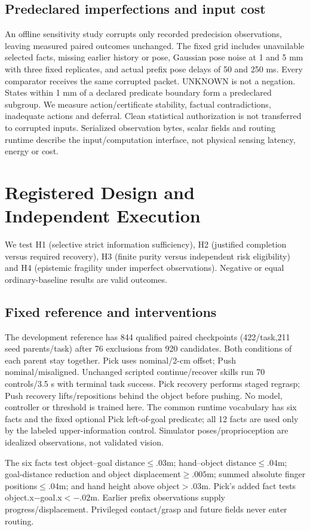 \documentclass[conference]{IEEEtran}
\begin{document}
\subsection{Predeclared imperfections and input cost}
An offline sensitivity study corrupts only recorded predecision observations, leaving measured paired outcomes unchanged. The fixed grid includes unavailable selected facts, missing earlier history or pose, Gaussian pose noise at 1 and 5 mm with three fixed replicates, and actual prefix pose delays of 50 and 250 ms. Every comparator receives the same corrupted packet. UNKNOWN is not a negation. States within 1 mm of a declared predicate boundary form a predeclared subgroup. We measure action/certificate stability, factual contradictions, inadequate actions and deferral. Clean statistical authorization is not transferred to corrupted inputs. Serialized observation bytes, scalar fields and routing runtime describe the input/computation interface, not physical sensing latency, energy or cost.

\section{Registered Design and Independent Execution}
We test H1 (selective strict information sufficiency), H2 (justified completion versus required recovery), H3 (finite purity versus independent risk eligibility) and H4 (epistemic fragility under imperfect observations). Negative or equal ordinary-baseline results are valid outcomes.
\subsection{Fixed reference and interventions}
The development reference has 844 qualified paired checkpoints (422/task,211 seed parents/task) after 76 exclusions from 920 candidates. Both conditions of each parent stay together. Pick uses nominal/2-cm offset; Push nominal/misaligned. Unchanged scripted continue/recover skills run 70 controls/3.5 s with terminal task success. Pick recovery performs staged regrasp; Push recovery lifts/repositions behind the object before pushing. No model, controller or threshold is trained here. The common runtime vocabulary has six facts and the fixed optional Pick left-of-goal predicate; all 12 facts are used only by the labeled upper-information control. Simulator poses/proprioception are idealized observations, not validated vision.

The six facts test object--goal distance$\le.03$m; hand--object distance$\le.04$m; goal-distance reduction and object displacement$\ge.005$m; summed absolute finger positions$\le.04$m; and hand height above object$>.03$m. Pick's added fact tests object.x$-$goal.x$<-.02$m. Earlier prefix observations supply progress/displacement. Privileged contact/grasp and future fields never enter routing.
\end{document}
